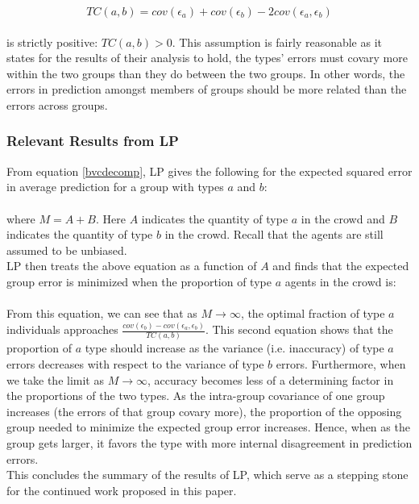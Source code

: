 \documentclass[twoside,twocolumn]{article}
\begin{document}
\begin{equation}
\label{typeco}
TC(a,b) = cov(\epsilon_a) + cov(\epsilon_b) - 2cov(\epsilon_a, \epsilon_b)
\end{equation}\\

is strictly positive: $TC(a,b) > 0$. This assumption is fairly reasonable as it states for the results of their analysis to hold, the types' errors must covary more within the two groups than they do between the two groups. In other words, the errors in prediction amongst members of groups should be more related than the errors across groups.

\subsubsection{Relevant Results from LP}

From equation \ref{bvcdecomp}, LP gives the following for the expected squared error in average prediction for a group with types $a$ and $b$:\\

\\


where $M = A + B$. Here $A$ indicates the quantity of type $a$ in the crowd and $B$ indicates the quantity of type $b$ in the crowd. Recall that the agents are still assumed to be unbiased.\\
\newline
LP then treats the above equation as a function of $A$ and finds that the expected group error is minimized when the proportion of type $a$ agents in the crowd is:\\

\\

From this equation, we can see that as $M \rightarrow \infty$, the optimal fraction of type $a$ individuals approaches $\frac{cov(\epsilon_b) - cov(\epsilon_a,\epsilon_b)}{TC(a,b)}$. This second equation shows that the proportion of $a$ type should increase as the variance (i.e. inaccuracy) of type $a$ errors decreases with respect to the variance of type $b$ errors. Furthermore, when we take the limit as $M \rightarrow \infty$, accuracy becomes less of a determining factor in the proportions of the two types. As the intra-group covariance of one group increases (the errors of that group covary more), the proportion of the opposing group needed to minimize the expected group error increases. Hence, when as the group gets larger, it favors the type with more internal disagreement in prediction errors.\\
\newline
This concludes the summary of the results of LP, which serve as a stepping stone for the continued work proposed in this paper.
\end{document}
